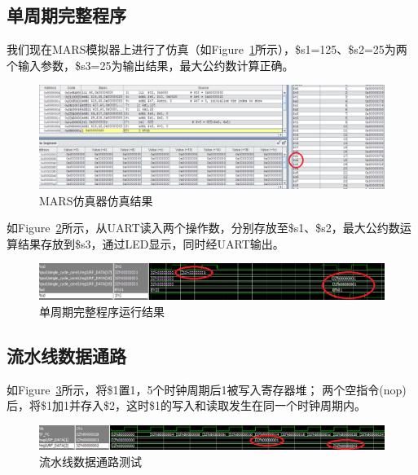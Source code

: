 \documentclass{article}
\begin{document}
        \subsection{单周期完整程序}
            我们现在MARS模拟器上进行了仿真（如Figure~\ref{fig:singlecycle_full1}所示），\$s1=125、\$s2=25为两个输入参数，\$s3=25为输出结果，最大公约数计算正确。
            \begin{figure}[H]
                \centering
                \includegraphics[width=\textwidth]{images/singlecycle_full1.png}
                \caption{\label{fig:singlecycle_full1}MARS仿真器仿真结果}
            \end{figure}
            如Figure~\ref{fig:singlecycle_full2}所示，从UART读入两个操作数，分别存放至\$s1、\$s2，最大公约数运算结果存放到\$s3，通过LED显示，同时经UART输出。
            \begin{figure}[H]
                \centering
                \includegraphics[width=\textwidth]{images/singlecycle_full2.png}
                \caption{\label{fig:singlecycle_full2}单周期完整程序运行结果}
            \end{figure}
            
        \subsection{流水线数据通路}
            如Figure~\ref{fig:pipeline_datapathtest}所示，将\$1置1，5个时钟周期后1被写入寄存器堆；
            两个空指令(nop)后，将\$1加1并存入\$2，这时\$1的写入和读取发生在同一个时钟周期内。
            \begin{figure}[H]
                \centering
                \includegraphics[width=\textwidth]{images/pipeline_datapathtest.png}
                \caption{\label{fig:pipeline_datapathtest}流水线数据通路测试}
            \end{figure}
\end{document}
